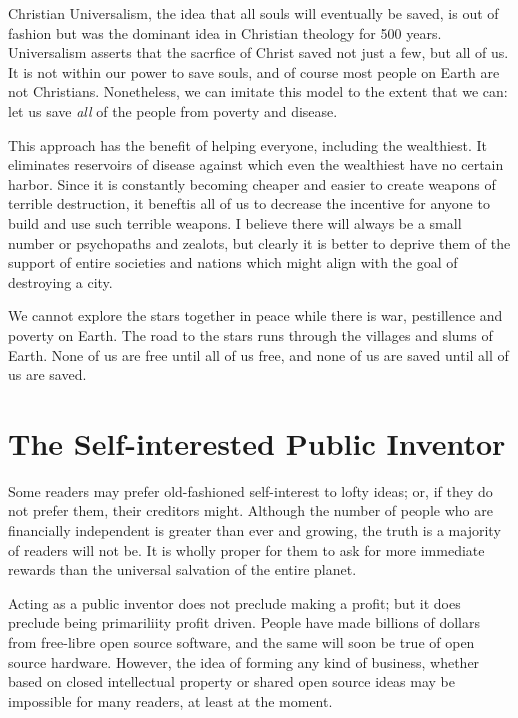\documentclass[
	fontsize=10pt, %
	twoside=false, %
	secnumdepth=1, %
]{kaobook}
\begin{document}
Christian Universalism, the idea that all souls will eventually be saved,
is out of fashion but was the dominant idea in Christian theology for
500 years\cite{hart2019all}.
Universalism asserts that the sacrfice of Christ saved not just a few,
but all of us.
It is not within our power to save souls, and of course most
people on Earth are not Christians.
Nonetheless, we can imitate this model to the extent that we can:
let us save {\em all} of the people from poverty and disease.

This approach has the benefit of helping everyone, including
the wealthiest.
It eliminates reservoirs of disease against which even the wealthiest
have no certain harbor.
Since it is constantly becoming cheaper and easier to create
weapons of terrible destruction, it beneftis all of us to
decrease the incentive for anyone to build and use such
terrible weapons.
I believe there will always be a small number or psychopaths
and zealots, but clearly it is better to deprive them
of the support of entire societies and nations which might
align with the goal of destroying a city.

We cannot explore the stars together in peace while
there is war, pestillence and poverty on Earth.
The road to the stars runs through the villages and slums
of Earth. None of us are free until all of us free,
and none of us are saved until all of us are saved.


\chapter{The Self-interested Public Inventor}

Some readers may prefer old-fashioned self-interest to
lofty ideas; or, if they do not prefer them, their creditors might.
Although the number of people who are financially independent is
greater than ever and growing, the truth is a majority of readers
will not be. It is wholly proper for them to ask for more immediate
rewards than the universal salvation of the entire planet.

Acting as a public inventor does not preclude making a profit;
but it does preclude being primariliity profit driven.
People have made billions of dollars from free-libre open source software,
and the same will soon be true of open source hardware.
However, the idea of forming any kind of business, whether based on
closed intellectual property or shared open source ideas may
be impossible for many readers, at least at the moment.
\end{document}

